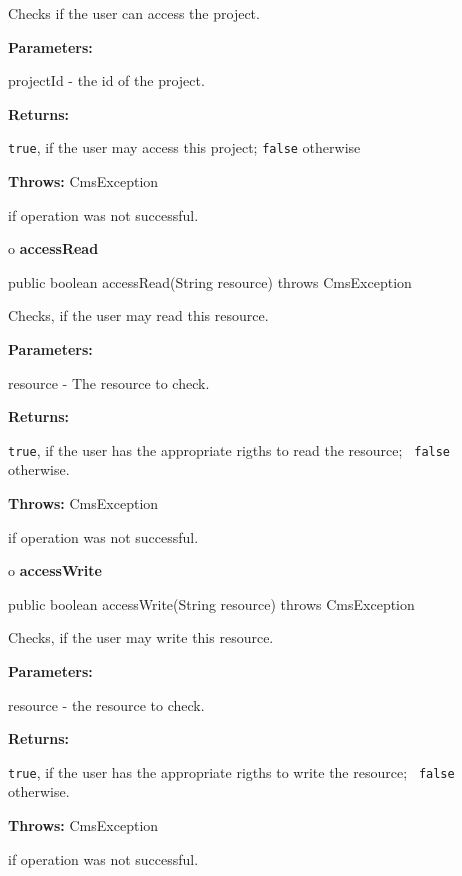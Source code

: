\begin{description}
\htmlDD Checks if the user can access the project. 

\begin{description}
\item {\bf Parameters:}  

projectId - the id of the project.  
\item {\bf Returns:}  

{\tt true}, if the user may access this project; {\tt false} otherwise  
\item {\bf Throws:} CmsException  

if operation was not successful.  
\end{description}

\end{description}

o {\bf accessRead} 

\begin{PRE}
 public boolean accessRead(String resource) throws CmsException
\end{PRE}

\begin{description}
\htmlDD Checks, if the user may read this resource. 

\begin{description}
\item {\bf Parameters:}  

resource - The resource to check.  
\item {\bf Returns:}  

{\tt true}, if the user has the appropriate rigths to read the resource; {\tt
false} otherwise.  
\item {\bf Throws:} CmsException  

if operation was not successful.  
\end{description}

\end{description}

o {\bf accessWrite} 

\begin{PRE}
 public boolean accessWrite(String resource) throws CmsException
\end{PRE}

\begin{description}
\htmlDD Checks, if the user may write this resource. 

\begin{description}
\item {\bf Parameters:}  

resource - the resource to check.  
\item {\bf Returns:}  

{\tt true}, if the user has the appropriate rigths to write the resource; {\tt
false} otherwise.  
\item {\bf Throws:} CmsException  

if operation was not successful.  
\end{description}

\end{description}


